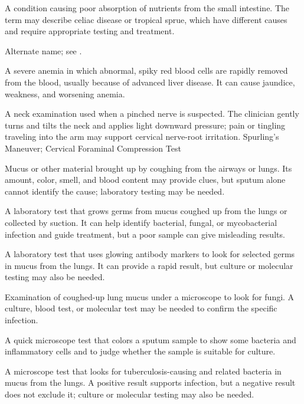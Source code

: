  A condition causing poor absorption of nutrients from the small intestine. The term may describe celiac disease or tropical sprue, which have different causes and require appropriate testing and treatment.

 Alternate name; see .

 A severe anemia in which abnormal, spiky red blood cells are rapidly removed from the blood, usually because of advanced liver disease. It can cause jaundice, weakness, and worsening anemia.

 A neck examination used when a pinched nerve is suspected. The clinician gently turns and tilts the neck and applies light downward pressure; pain or tingling traveling into the arm may support cervical nerve-root irritation.
\synonyms
Spurling's Maneuver; Cervical Foraminal Compression Test

 Mucus or other material brought up by coughing from the airways or lungs. Its amount, color, smell, and blood content may provide clues, but sputum alone cannot identify the cause; laboratory testing may be needed.

 A laboratory test that grows germs from mucus coughed up from the lungs or collected by suction. It can help identify bacterial, fungal, or mycobacterial infection and guide treatment, but a poor sample can give misleading results.

 A laboratory test that uses glowing antibody markers to look for selected germs in mucus from the lungs. It can provide a rapid result, but culture or molecular testing may also be needed.

 Examination of coughed-up lung mucus under a microscope to look for fungi. A culture, blood test, or molecular test may be needed to confirm the specific infection.

 A quick microscope test that colors a sputum sample to show some bacteria and inflammatory cells and to judge whether the sample is suitable for culture.

 A microscope test that looks for tuberculosis-causing and related bacteria in mucus from the lungs. A positive result supports infection, but a negative result does not exclude it; culture or molecular testing may also be needed.

